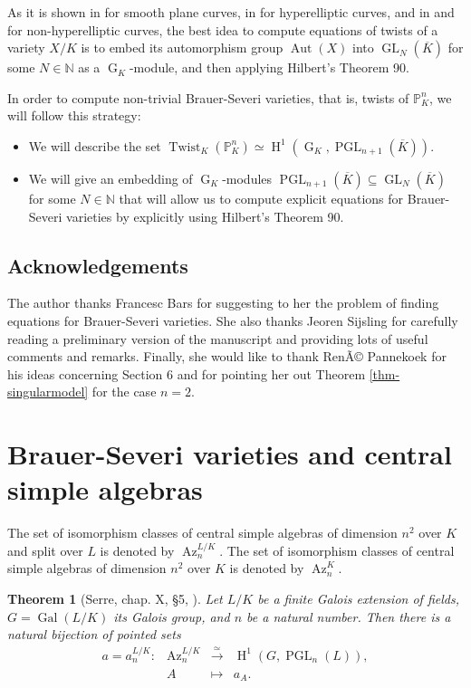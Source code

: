 \documentclass[a4paper,10pt]{amsart}
\theoremstyle{plain}
\newtheorem{theorem}{Theorem}[section]
\theoremstyle{definition}
\theoremstyle{remark}
\numberwithin{equation}{section}
\begin{document}
As it is shown in \cite{BaBaEl1} for smooth plane curves, in \cite{LomLor} for hyperelliptic curves, and in \cite{Loth} and \cite{Lo} for non-hyperelliptic curves, the best idea to compute equations of twists of a variety $X/K$ is to embed its automorphism group $\operatorname{Aut}(X)$ into $\operatorname{GL}_N(\overline{K})$ for some $N\in\mathbb{N}$ as a $\operatorname{G}_K$-module, and then applying Hilbert's Theorem 90.

In order to compute non-trivial Brauer-Severi varieties, that is, twists of $\mathbb{P}^n_K$, we will follow this strategy:

\begin{itemize}
	\item We will describe the set $\operatorname{Twist}_K(\mathbb{P}^{n}_{K})\simeq\operatorname{H}^1(\operatorname{G}_K,\operatorname{PGL}_{n+1}(\overline{K}))$.
	\item We will give an embedding of $\operatorname{G}_K$-modules $\operatorname{PGL}_{n+1}(\overline{K})\subseteq\operatorname{GL}_N(\overline{K})$ for some $N\in\mathbb{N}$ that will allow us to compute explicit equations for Brauer-Severi varieties by explicitly using Hilbert's Theorem 90.
\end{itemize}  

\subsection*{Acknowledgements} The author thanks Francesc Bars for suggesting to her the problem of finding equations for Brauer-Severi varieties. She also thanks Jeoren Sijsling for carefully reading a preliminary version of the manuscript and providing lots of useful comments and remarks. Finally, she would like to thank RenÃ© Pannekoek for his ideas concerning Section $6$ and for pointing her out Theorem \ref{thm-singularmodel} for the case $n=2$.

\section{Brauer-Severi varieties and central simple algebras}

 The set of isomorphism classes of central simple algebras of dimension $n^2$ over $K$ and split over $L$ is denoted by $\operatorname{Az}_{n}^{L/K}$. The set of isomorphism classes of central simple algebras of dimension $n^2$ over $K$ is denoted  by $\operatorname{Az}_{n}^{K}$. 

\begin{theorem}[Serre, chap. X, \S5, \cite{SeL}]\label{thm-cocycle}
Let $L/K$ be a finite Galois extension of fields, $G=\operatorname{Gal}(L/K)$ its Galois group, and $n$ be a natural number. Then there is a natural bijection of pointed sets
$$
\begin{array}{cccc}
a=a^{L/K}_n: & \operatorname{Az}_{n}^{L/K} & \xrightarrow{\simeq} & \operatorname{H}^1(G,\operatorname{PGL}_{n}(L)),\\
& A & \mapsto & a_A.
\end{array}
$$
\end{theorem}
\end{document}

